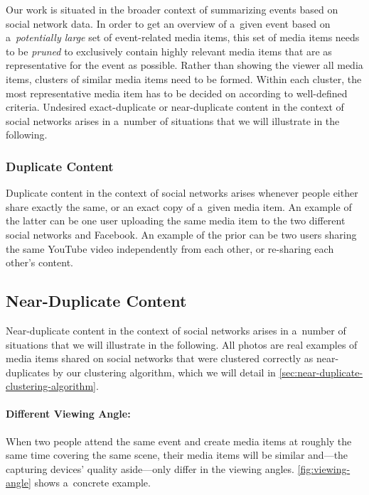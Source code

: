 Our work is situated in the broader context of summarizing events
based on social network data.
In order to get an overview of a~given event based on a~\emph{potentially large} set
of event-related media items, this set of media items needs to be \emph{pruned}
to exclusively contain highly relevant media items that are as representative
for the event as possible.
Rather than showing the viewer all media items,
clusters of similar media items need to be formed.
Within each cluster, the most representative media item
has to be decided on according to well-defined criteria.
Undesired exact-duplicate or near-duplicate content in the context of social networks
arises in a~number of situations
that we will illustrate in the following.

\subsubsection{Duplicate Content}
\label{sec:duplicate-content}

Duplicate content in the context of social networks
arises whenever people either share exactly the same,
or an exact copy of a~given media item.
An example of the latter can be one user uploading the same media item
to the two different social networks \googleplus and Facebook.
An example of the prior can be two users sharing the same
YouTube video independently from each other, or re-sharing each other's content.

\subsection{Near-Duplicate Content}
\label{sec:near-duplicate-content}

Near-duplicate content in the context of social networks
arises in a~number of situations
that we will illustrate in the following.
All photos are real examples of media items shared on social networks
that were clustered correctly as near-duplicates
by our clustering algorithm, which we will detail in
\autoref{sec:near-duplicate-clustering-algorithm}.

\paragraph{Different Viewing Angle:}

When two people attend the same event
and create media items at roughly the same time
covering the same scene,
their media items will be similar
and---the capturing devices' quality aside---only differ in the viewing angles.
\autoref{fig:viewing-angle} shows a~concrete example.

